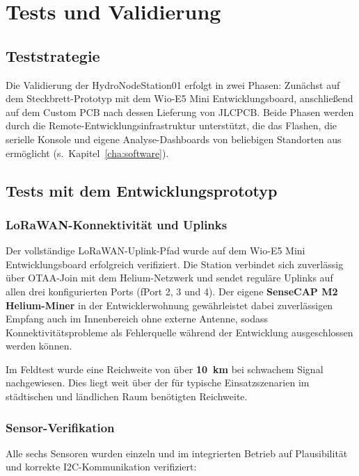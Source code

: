 \chapter{Tests und Validierung}
\label{cha:testing}

\section*{Teststrategie}

Die Validierung der HydroNodeStation01 erfolgt in zwei Phasen: Zunächst auf dem Steckbrett-Prototyp mit dem Wio-E5 Mini Entwicklungsboard, anschließend auf dem Custom PCB nach dessen Lieferung von JLCPCB. Beide Phasen werden durch die Remote-Entwicklungsinfrastruktur unterstützt, die das Flashen, die serielle Konsole und eigene Analyse-Dashboards von beliebigen Standorten aus ermöglicht (s.\ Kapitel~\ref{cha:software}).

\section*{Tests mit dem Entwicklungsprototyp}

\subsection*{LoRaWAN-Konnektivität und Uplinks}

Der vollständige LoRaWAN-Uplink-Pfad wurde auf dem Wio-E5 Mini Entwicklungsboard erfolgreich verifiziert. Die Station verbindet sich zuverlässig über OTAA-Join mit dem Helium-Netzwerk und sendet reguläre Uplinks auf allen drei konfigurierten Ports (fPort 2, 3 und 4). Der eigene \textbf{SenseCAP M2 Helium-Miner} in der Entwicklerwohnung gewährleistet dabei zuverlässigen Empfang auch im Innenbereich ohne externe Antenne, sodass Konnektivitätsprobleme als Fehlerquelle während der Entwicklung ausgeschlossen werden können.

Im Feldtest wurde eine Reichweite von über \textbf{10~km} bei schwachem Signal nachgewiesen. Dies liegt weit über der für typische Einsatzszenarien im städtischen und ländlichen Raum benötigten Reichweite.

\subsection*{Sensor-Verifikation}

Alle sechs Sensoren wurden einzeln und im integrierten Betrieb auf Plausibilität und korrekte I2C-Kommunikation verifiziert:

